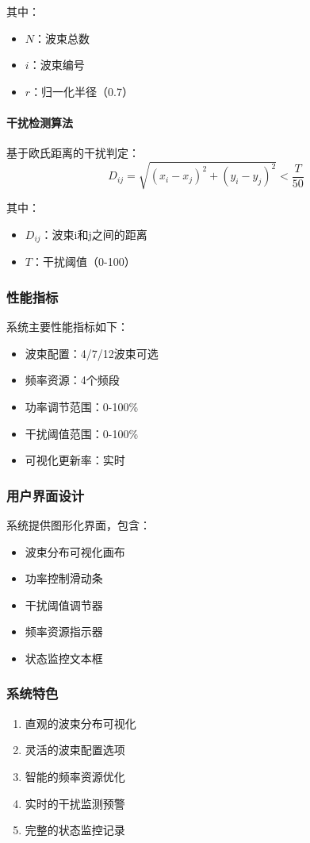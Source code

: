 \documentclass[12pt]{article}
\begin{document}
其中：
\begin{itemize}
    \item $N$：波束总数
    \item $i$：波束编号
    \item $r$：归一化半径（0.7）
\end{itemize}

\paragraph{干扰检测算法}
基于欧氏距离的干扰判定：
\begin{equation}
D_{ij} = \sqrt{(x_i-x_j)^2 + (y_i-y_j)^2} < \frac{T}{50}
\end{equation}

其中：
\begin{itemize}
    \item $D_{ij}$：波束i和j之间的距离
    \item $T$：干扰阈值（0-100）
\end{itemize}

\subsubsection{性能指标}
系统主要性能指标如下：
\begin{itemize}
    \item 波束配置：4/7/12波束可选
    \item 频率资源：4个频段
    \item 功率调节范围：0-100\%
    \item 干扰阈值范围：0-100\%
    \item 可视化更新率：实时
\end{itemize}

\subsubsection{用户界面设计}
系统提供图形化界面，包含：
\begin{itemize}
    \item 波束分布可视化画布
    \item 功率控制滑动条
    \item 干扰阈值调节器
    \item 频率资源指示器
    \item 状态监控文本框
\end{itemize}

\subsubsection{系统特色}
\begin{enumerate}
    \item 直观的波束分布可视化
    \item 灵活的波束配置选项
    \item 智能的频率资源优化
    \item 实时的干扰监测预警
    \item 完整的状态监控记录
\end{enumerate}
\end{document}
